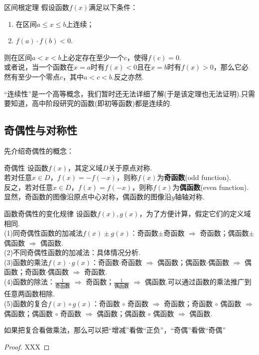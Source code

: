 \documentclass[lang=cn, zihao=5]{elegantbook}
\begin{document}
\begin{theorem}{区间根定理}
    假设函数$f(x)$满足以下条件：
    \begin{enumerate}
        \item 在区间$a \leq x \leq b$上连续；
        \item $f(a) \cdot f(b)<0$.
    \end{enumerate}
    则在区间$a<x<b$上必定存在至少一个$c$，使得$f(c)=0$.\\
    或者说，当一个函数在$x=a$时有$f(x)<0$且在$x=b$时有$f(x)>0$，那么它必然有至少一个零点$c$，其中$a<c<b$.反之亦然.
\end{theorem}
\begin{remark}
	“连续性”是一个高等概念，我们暂时还无法详细了解(于是该定理也无法证明).只需要知道，高中阶段研究的函数(即初等函数)都是连续的.
\end{remark}

\subsection{奇偶性与对称性}

先介绍奇偶性的概念：

\begin{definition}{奇偶性} %
    设函数$f(x)$，其定义域$D$关于原点对称.\\
    若对任意$x \in D$，$f(x)=-f(-x)$，则称$f(x)$为\textbf{奇函数}(odd function).\\
    反之，若对任意$x \in D$，$f(x)=f(-x)$，则称$f(x)$为\textbf{偶函数}(even function).\\
    显然，奇函数的图像沿原点中心对称，偶函数的图像沿$y$轴轴对称.
\end{definition}

\begin{proposition}{函数奇偶性的变化规律}
    设函数$f(x),g(x)$，为了方便计算，假定它们的定义域相同.\\
    (1)同奇偶性函数的加减法$f(x) \pm g(x)$：奇函数$\pm$奇函数 $\Rightarrow$ 奇函数；偶函数$\pm$偶函数 $\Rightarrow$ 偶函数.\\
    (2)不同奇偶性函数的加减法：具体情况分析.\\
    (3)函数的乘法$f(x) \cdot g(x)$：奇函数$\cdot$奇函数 $\Rightarrow$ 偶函数；偶函数$\cdot$偶函数 $\Rightarrow$ 偶函数；奇函数$\cdot$偶函数 $\Rightarrow$ 奇函数.\\
    (4)函数的除法：$\frac{1}{\text{奇函数}}$ $\Rightarrow$ 奇函数；$\frac{1}{\text{偶函数}}$ $\Rightarrow$ 偶函数.可以通过函数的乘法推广到任意两函数相除.\\
    (5)函数的复合$f(x) \circ g(x)$：奇函数 $\circ$ 奇函数 $\Rightarrow$ 奇函数；奇函数 $\circ$ 偶函数 $\Rightarrow$ 偶函数；偶函数 $\circ$ 奇函数 $\Rightarrow$ 偶函数；偶函数 $\circ$ 偶函数 $\Rightarrow$ 偶函数.
\end{proposition}
\begin{remark}
	如果把复合看做乘法，那么可以把“增减”看做“正负”，“奇偶”看做“奇偶”
\end{remark}
\begin{proof}
    XXX
\end{proof}
\end{document}
